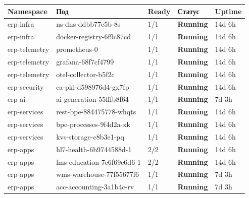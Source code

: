 \documentclass[12pt,a4paper]{article}
\begin{document}
\vspace{8pt}
\begin{longtable}{L{3.2cm} L{5.2cm} L{1.5cm} L{3cm} L{1.5cm}}
\toprule
{}
\color{primary}\textbf{Namespace} &
\color{primary}\textbf{Под} &
\color{primary}\textbf{Ready} &
\color{primary}\textbf{Статус} &
\color{primary}\textbf{Uptime} \\
\midrule\endhead\bottomrule\endfoot
erp-infra     & ns-dns-ddbb77c5b-8s        & 1/1 & \textcolor{successgreen}{\textbf{Running}} & 14d 6h \\[2pt]
erp-infra & docker-registry-6f9c87cd & 1/1 & \textcolor{successgreen}{\textbf{Running}} & 14d 6h \\[2pt]
erp-telemetry & prometheus-0               & 1/1 & \textcolor{successgreen}{\textbf{Running}} & 14d 6h \\[2pt]
erp-telemetry & grafana-68f7cf4799    & 1/1 & \textcolor{successgreen}{\textbf{Running}} & 14d 6h \\[2pt]
erp-telemetry & otel-collector-b5f2c & 1/1 & \textcolor{successgreen}{\textbf{Running}} & 14d 6h \\[2pt]
erp-security  & ca-pki-d598976d4-gx7fp     & 1/1 & \textcolor{successgreen}{\textbf{Running}} & 14d 6h \\[2pt]
erp-ai & ai-generation-55fffb8f64  & 1/1 & \textcolor{successgreen}{\textbf{Running}} & 7d 3h  \\[2pt]
erp-services  & rest-bpe-884475778-whqts   & 1/1 & \textcolor{successgreen}{\textbf{Running}} & 14d 6h \\[2pt]
erp-services & bpe-processes-9f4d2a-xk & 1/1 & \textcolor{successgreen}{\textbf{Running}} & 14d 6h \\[2pt]
erp-services  & kvs-storage-c8b3e1-pq     & 1/1 & \textcolor{successgreen}{\textbf{Running}} & 14d 6h \\[2pt]
erp-apps & hl7-health-6b9744588d-1  & 2/2 & \textcolor{successgreen}{\textbf{Running}} & 14d 6h \\[2pt]
erp-apps      & lms-education-7c6f69c6d6-1 & 2/2 & \textcolor{successgreen}{\textbf{Running}} & 14d 6h \\[2pt]
erp-apps & wms-warehouse-77f55677f6 & 1/1 & \textcolor{successgreen}{\textbf{Running}} & 7d 3h  \\[2pt]
erp-apps      & acc-accounting-3a1b4c-rv   & 1/1 & \textcolor{successgreen}{\textbf{Running}} & 7d 3h  \\[2pt]
\end{longtable}
\end{document}

